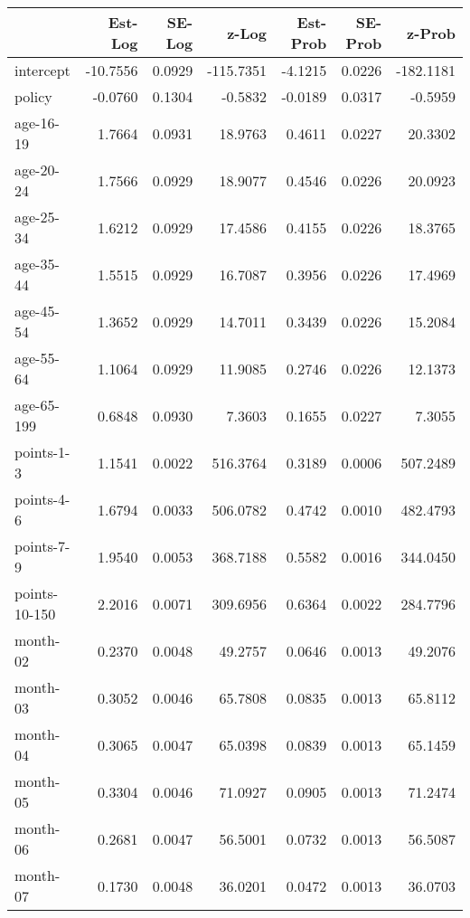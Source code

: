 \documentclass[10pt]{article}
\begin{document}
\clearpage
\pagebreak




\begin{table}[ht]
\centering
\begin{tabular}{lrrrrrr}
  \hline
 & Est-Log & SE-Log & z-Log & Est-Prob & SE-Prob & z-Prob \\ 
  \hline
intercept & -10.7556 & 0.0929 & -115.7351 & -4.1215 & 0.0226 & -182.1181 \\ 
  policy & -0.0760 & 0.1304 & -0.5832 & -0.0189 & 0.0317 & -0.5959 \\ 
  age-16-19 & 1.7664 & 0.0931 & 18.9763 & 0.4611 & 0.0227 & 20.3302 \\ 
  age-20-24 & 1.7566 & 0.0929 & 18.9077 & 0.4546 & 0.0226 & 20.0923 \\ 
  age-25-34 & 1.6212 & 0.0929 & 17.4586 & 0.4155 & 0.0226 & 18.3765 \\ 
  age-35-44 & 1.5515 & 0.0929 & 16.7087 & 0.3956 & 0.0226 & 17.4969 \\ 
  age-45-54 & 1.3652 & 0.0929 & 14.7011 & 0.3439 & 0.0226 & 15.2084 \\ 
  age-55-64 & 1.1064 & 0.0929 & 11.9085 & 0.2746 & 0.0226 & 12.1373 \\ 
  age-65-199 & 0.6848 & 0.0930 & 7.3603 & 0.1655 & 0.0227 & 7.3055 \\ 
  points-1-3 & 1.1541 & 0.0022 & 516.3764 & 0.3189 & 0.0006 & 507.2489 \\ 
  points-4-6 & 1.6794 & 0.0033 & 506.0782 & 0.4742 & 0.0010 & 482.4793 \\ 
  points-7-9 & 1.9540 & 0.0053 & 368.7188 & 0.5582 & 0.0016 & 344.0450 \\ 
  points-10-150 & 2.2016 & 0.0071 & 309.6956 & 0.6364 & 0.0022 & 284.7796 \\ 
  month-02 & 0.2370 & 0.0048 & 49.2757 & 0.0646 & 0.0013 & 49.2076 \\ 
  month-03 & 0.3052 & 0.0046 & 65.7808 & 0.0835 & 0.0013 & 65.8112 \\ 
  month-04 & 0.3065 & 0.0047 & 65.0398 & 0.0839 & 0.0013 & 65.1459 \\ 
  month-05 & 0.3304 & 0.0046 & 71.0927 & 0.0905 & 0.0013 & 71.2474 \\ 
  month-06 & 0.2681 & 0.0047 & 56.5001 & 0.0732 & 0.0013 & 56.5087 \\ 
  month-07 & 0.1730 & 0.0048 & 36.0201 & 0.0472 & 0.0013 & 36.0703 \\ 

\end{tabular}
\end{table}
\end{document}
